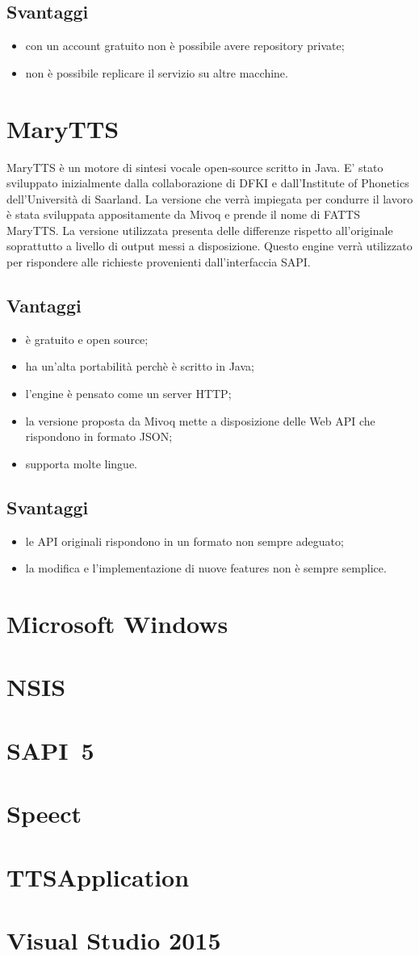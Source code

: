 \subsection*{Svantaggi}
\begin{itemize}
	\item con un account gratuito non è possibile avere repository private;
	\item non è possibile replicare il servizio su altre macchine.
\end{itemize}
\section{MaryTTS}
MaryTTS è un motore di sintesi vocale open-source scritto in Java. E' stato sviluppato inizialmente dalla collaborazione di DFKI e dall'Institute of Phonetics dell'Università di Saarland. La versione che verrà impiegata per condurre il lavoro è stata sviluppata appositamente da Mivoq e prende il nome di FATTS MaryTTS. La versione utilizzata presenta delle differenze rispetto all'originale soprattutto a livello di output messi a disposizione.
Questo engine verrà utilizzato per rispondere alle richieste provenienti dall'interfaccia SAPI.
\subsection*{Vantaggi}
\begin{itemize}
	\item è gratuito e open source;
	\item ha un'alta portabilità perchè è scritto in Java;
	\item l'engine è pensato come un server HTTP;
	\item la versione proposta da Mivoq mette a disposizione delle Web API che rispondono in formato JSON;
	\item supporta molte lingue.
\end{itemize}
\subsection*{Svantaggi}
\begin{itemize}
	\item le API originali rispondono in un formato non sempre adeguato;
	\item la modifica e l'implementazione di nuove features non è sempre semplice.
\end{itemize}
\section{Microsoft Windows}
\section{NSIS}
\section{SAPI~5}
\section{Speect}
\section{TTSApplication}
\section{Visual Studio 2015}
